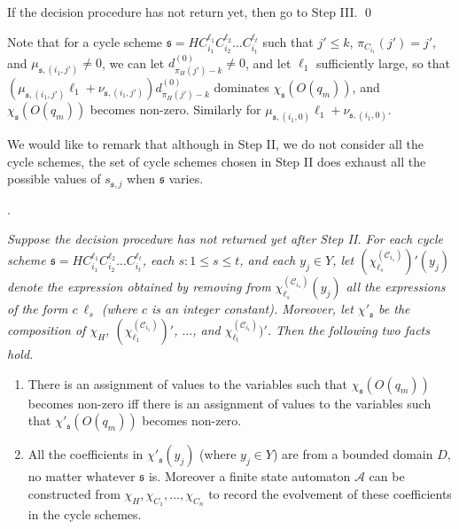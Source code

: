 \documentclass[runningheads,a4paper]{llncs}
\def\Aa{{\mathcal{A} }}
\def\Cc{{\mathcal{C} }}
\def\schm{{\mathfrak{s} }}
\begin{document}
If the decision procedure has not return yet, then go to Step III. \qed

\smallskip

Note that for a cycle scheme $\schm=HC_{i_1}^{\ell_1} C_{i_2}^{\ell_2} \dots C_{i_t}^{\ell_t}$ such that $j' \le k$, $\pi_{C_{i_1}}(j')=j'$, and $\mu_{\schm,(i_1,j')} \neq 0$, we can let $d^{(0)}_{\pi_H(j')-k} \neq 0$, and let $\ell_1$ sufficiently large, so that $(\mu_{\schm,(i_1,j')} \ell_1 + \nu_{\schm,(i_1,j')})d^{(0)}_{\pi_H(j')-k}$ dominates $\chi_{\schm}(O(q_m))$, and  $\chi_{\schm}(O(q_m))$ becomes non-zero. Similarly for $\mu_{\schm,(i_1,0)} \ell_1 + \nu_{\schm,(i_1,0)}$.

We would like to remark that although in Step II, we do not consider all the cycle schemes, the set of cycle schemes chosen in Step II does exhaust all the possible values of $s_{\schm,j}$ when $\schm$ varies.


\medskip

. 
{\it 
Suppose the decision procedure has not returned yet after Step II. For each cycle scheme $\schm=HC_{i_1}^{\ell_1} C_{i_2}^{\ell_2} \dots C_{i_t}^{\ell_t}$, each $s: 1 \le s \le t$, and each $y_j \in Y$, let $(\chi^{(\Cc_{i_s})}_{\ell_s})'(y_j)$ denote the expression obtained by removing from $\chi^{(\Cc_{i_s})}_{\ell_s}(y_j)$  all the expressions of the form $c\ \ell_s$ (where $c$ is an integer constant).  Moreover, let $\chi'_\schm$ be the composition of $\chi_H$, $(\chi^{(\Cc_{i_1})}_{\ell_1})'$, $\dots$, and $\chi^{(\Cc_{i_t})}_{\ell_t})'$. Then the following two facts hold.
\begin{enumerate}
\item There is an assignment of values to the variables such that $\chi_\schm(O(q_m))$ becomes non-zero iff there is an assignment of values to the variables such that $\chi'_\schm(O(q_m))$ becomes non-zero.
%
\item All the coefficients in $\chi'_\schm(y_j)$ (where $y_j \in Y$) are from a bounded domain $D$, no matter whatever $\schm$ is. Moreover a finite state automaton $\Aa$ can be constructed from $\chi_H,\chi_{C_1},\dots,\chi_{C_n}$ to record the evolvement of these coefficients  in the cycle schemes.
\end{enumerate}
}
\end{document}

